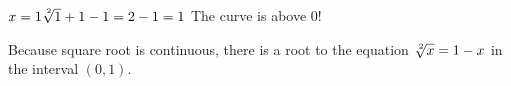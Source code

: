 \documentclass{article}
\begin{document}
\begin{enumerate}
	$x=1 \\
	\sqrt[\leftroot{-1}\uproot{2}2]{1} + 1 -1 = 2 - 1 = 1$
	The curve is above 0!
	
	Because square root is continuous, there is a root to the equation $\sqrt[\leftroot{-1}\uproot{2}2]{x} =1-x$ in the interval $(0,1)$.
\end{enumerate}
\end{document}
